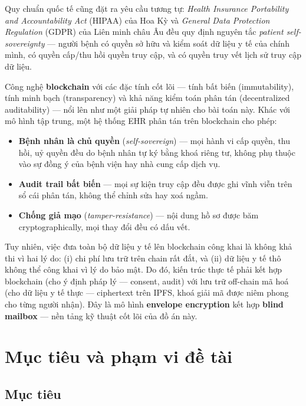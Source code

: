 \documentclass[../DoAn]{subfiles}
\begin{document}
Quy chuẩn quốc tế cũng đặt ra yêu cầu tương tự: \textit{Health Insurance Portability and Accountability Act} (HIPAA) của Hoa Kỳ \cite{hipaa1996} và \textit{General Data Protection Regulation} (GDPR) của Liên minh châu Âu \cite{gdpr2016} đều quy định nguyên tắc \textit{patient self-sovereignty} --- người bệnh có quyền sở hữu và kiểm soát dữ liệu y tế của chính mình, có quyền cấp/thu hồi quyền truy cập, và có quyền truy vết lịch sử truy cập dữ liệu.

Công nghệ \textbf{blockchain} với các đặc tính cốt lõi --- tính bất biến (immutability), tính minh bạch (transparency) và khả năng kiểm toán phân tán (decentralized auditability) --- nổi lên như một giải pháp tự nhiên cho bài toán này. Khác với mô hình tập trung, một hệ thống EHR phân tán trên blockchain cho phép:

\begin{itemize}
    \item \textbf{Bệnh nhân là chủ quyền} (\textit{self-sovereign}) --- mọi hành vi cấp quyền, thu hồi, uỷ quyền đều do bệnh nhân tự ký bằng khoá riêng tư, không phụ thuộc vào sự đồng ý của bệnh viện hay nhà cung cấp dịch vụ.
    \item \textbf{Audit trail bất biến} --- mọi sự kiện truy cập đều được ghi vĩnh viễn trên sổ cái phân tán, không thể chỉnh sửa hay xoá ngầm.
    \item \textbf{Chống giả mạo} (\textit{tamper-resistance}) --- nội dung hồ sơ được băm cryptographically, mọi thay đổi đều có dấu vết.
\end{itemize}

Tuy nhiên, việc đưa toàn bộ dữ liệu y tế lên blockchain công khai là không khả thi vì hai lý do: (i) chi phí lưu trữ trên chain rất đắt, và (ii) dữ liệu y tế thô không thể công khai vì lý do bảo mật. Do đó, kiến trúc thực tế phải kết hợp blockchain (cho ý định pháp lý --- consent, audit) với lưu trữ off-chain mã hoá (cho dữ liệu y tế thực --- ciphertext trên IPFS, khoá giải mã được niêm phong cho từng người nhận). Đây là mô hình \textbf{envelope encryption} kết hợp \textbf{blind mailbox} --- nền tảng kỹ thuật cốt lõi của đồ án này.

\section{Mục tiêu và phạm vi đề tài}

\subsection*{Mục tiêu}
\end{document}
